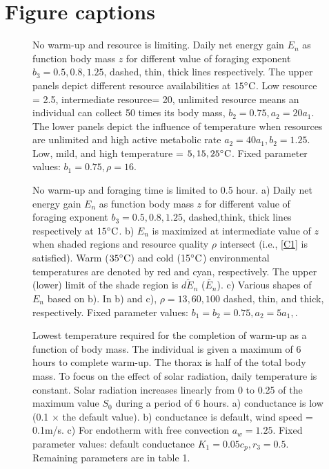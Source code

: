 \section*{Figure captions}
\begin{figure}[H]
\begin{center}
\caption{
	No warm-up and resource is limiting.
	Daily net energy gain  $E_n$ as function body mass $z$ for different value of foraging exponent $b_3 = 0.5, 0.8, 1.25$, dashed, thin, thick lines respectively.
	The upper panels depict different resource availabilities at $15 ^{\circ} \rm{C}$. 
	Low resource = 2.5, intermediate resource= 20, unlimited resource means an individual can collect 50 times its body mass, $b_2 = 0.75, a_2 = 20 a_1$. 
	The lower panels depict the influence of temperature when resources are unlimited and high active metabolic rate $a_2 = 40 a_1, b_2  = 1.25$.
	Low, mild, and high temperature = $5, 15, 25^{\circ} \rm{C}$.
	Fixed parameter values: $b_1 = 0.75, \rho = 16$.
}
\label{fig1}
\end{center}
\end{figure}
\vspace{-1.5cm}
%
\begin{figure}[H]
\begin{center}
\caption{
	No warm-up and foraging time is limited to 0.5 hour.
	a) Daily net energy gain  $E_n$ as function body mass $z$ for different value of foraging exponent $b_3 = 0.5, 0.8, 1.25$, dashed,think, thick lines respectively  at $15 ^{\circ} \rm{C}$.
	b) $E_n$ is maximized at intermediate value of $z$  when shaded regions and resource quality $\rho$ intersect (i.e., \cref{C1} is satisfied).
	Warm ($35^{\circ} \rm{C}$) and cold (15$^{\circ} \rm{C}$) environmental temperatures are denoted by red and cyan, respectively.
	The upper (lower) limit of the shade region is $\widetilde{dE_n}$ ($\widetilde{E_n}$).  
	c) Various shapes of $E_n$ based on b).
	In b) and c), $\rho = 13, 60, 100$ dashed, thin, and thick, respectively.
	Fixed parameter values: $b_1 = b_2 = 0.75, a_2 = 5 a_1, $.
}
\label{fig2}
\end{center}
\end{figure}
\vspace{-1.5cm}
%
\begin{figure}[H]
\begin{center}
\caption{
	Lowest temperature required for the completion of warm-up as a function of body mass.
	The individual is given a maximum of 6 hours to complete warm-up.
	The thorax is half of the total body mass.
	To focus on the effect of solar radiation, daily temperature is constant.
	Solar radiation increases linearly from 0 to 0.25 of the maximum value $S_0$ during a period of 6 hours. 
	a) conductance is low (0.1 $\times$ the default value).
	b) conductance is default, wind speed  = 0.1m/s.
	c) For endotherm with free convection $a_w = 1.25$. 
	Fixed parameter values: default conductance $K_1 = 0.05 c_p, r_3 = 0.5$.
	Remaining parameters are in table 1.
}%
\label{fig3}
\end{center}
\end{figure}
